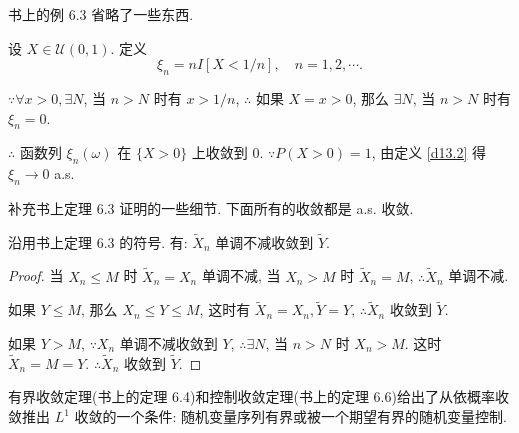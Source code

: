 \documentclass{ctexart}
\begin{document}
书上的例 6.3 省略了一些东西.
\begin{example}
    设 $X\in\mathcal{U}(0,1)$. 定义
    \[\xi_n=nI[X<1/n],\quad n=1,2,\cdots.\]

    $\because\forall x>0,\exists N$, 当 $n>N$ 时有 $x>1/n$, $\therefore$ 如果 $X=x>0$, 那么 $\exists N$, 当 $n>N$ 时有 $\xi_n=0$.
    
    $\therefore$ 函数列 $\xi_n(\omega)$ 在 $\{X>0\}$ 上收敛到 $0$. $\because P(X>0)=1$, 由定义 \ref{d13.2} 得 $\xi_n\to0$ a.s.
\end{example}

补充书上定理 6.3 证明的一些细节. 下面所有的收敛都是 a.s. 收敛.
\begin{theorem}
    沿用书上定理 6.3 的符号. 有: $\tilde{X}_n$ 单调不减收敛到 $\tilde{Y}$.
\end{theorem}
\begin{proof}
    当 $X_n\leq M$ 时 $\tilde{X}_n=X_n$ 单调不减, 当 $X_n>M$ 时 $\tilde{X}_n=M$, $\therefore\tilde{X}_n$ 单调不减.

    如果 $Y\leq M$, 那么 $X_n\leq Y\leq M$, 这时有 $\tilde{X}_n=X_n,\tilde{Y}=Y$, $\therefore\tilde{X}_n$ 收敛到 $\tilde{Y}$.
    
    如果 $Y>M$, $\because X_n$ 单调不减收敛到 $Y$, $\therefore\exists N$, 当 $n>N$ 时 $X_n>M$. 这时 $\tilde{X}_n=M=Y$. $\therefore\tilde{X}_n$ 收敛到 $\tilde{Y}$.
\end{proof}

有界收敛定理(书上的定理 6.4)和控制收敛定理(书上的定理 6.6)给出了从依概率收敛推出 $L^1$ 收敛的一个条件: 随机变量序列有界或被一个期望有界的随机变量控制.
\end{document}
